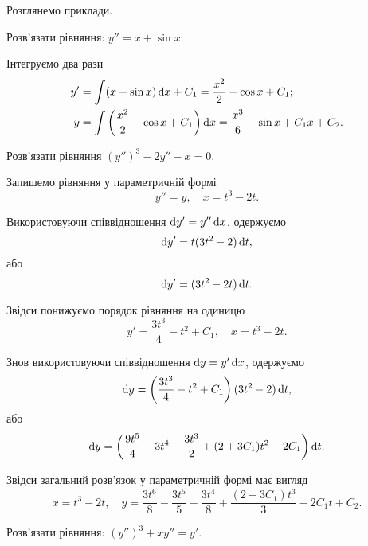 Розглянемо приклади.
\begin{example}
	Розв'язати рівняння: $y'' = x + \sin x$.
\end{example}

\begin{solution}
	Інтегруємо два рази
	\begin{align*}
		y' &= \int (x + \sin x) \mathop{}\!\mathrm{d} x + C_1 = \frac{x^2}{2} - \cos x + C_1; \\
		y &= \int \left( \frac{x^2}{2} - \cos x + C_1 \right) \mathop{}\!\mathrm{d} x = \frac{x^3}{6} - \sin x + C_1 x+ C_2.
	\end{align*}
\end{solution}

\begin{example}
	Розв'язати рівняння $(y'')^3 - 2 y'' - x = 0$.
\end{example}

\begin{solution}
	Запишемо рівняння у параметричній формі \[ y'' = y, \quad x = t^3 - 2 t. \] 
	
	Використовуючи співвідношення $\mathop{}\!\mathrm{d} y' = y'' \mathop{}\!\mathrm{d} x$, одержуємо \[ \mathop{}\!\mathrm{d} y' = t (3t^2 - 2) \mathop{}\!\mathrm{d} t,\] або \[ \mathop{}\!\mathrm{d} y' = (3t^2 - 2t) \mathop{}\!\mathrm{d} t.\]
	
	Звідси понижуємо порядок рівняння на одиницю \[ y' = \frac{3t^3}{4}-t^2+C_1, \quad x = t^3 - 2t.\]
	
	Знов використовуючи співвідношення $\mathop{}\!\mathrm{d} y = y' \mathop{}\!\mathrm{d} x$, одержуємо \[ \mathop{}\!\mathrm{d} y = \left( \frac{3t^3}{4}-t^2+C_1 \right)  (3t^2 - 2) \mathop{}\!\mathrm{d} t,\] або \[ \mathop{}\!\mathrm{d} y = \left( \frac{9t^5}{4} - 3 t^4 - \frac{3t^3}{2} + (2 + 3 C_1) t^2 - 2 C_1 \right) \mathop{}\!\mathrm{d} t.\]
	
	Звідси загальний розв'язок у параметричній формі має вигляд \[ x = t^3 - 2 t, \quad y = \frac{3t^6}{8} - \frac{3 t^5}{5} - \frac{3t^4}{8} + \frac{(2 + 3 C_1) t^3}{3} - 2 C_1 t + C_2.\]
\end{solution}

\begin{example}
	Розв'язати рівняння: $(y'')^3 + x y'' = y'$.
\end{example}

